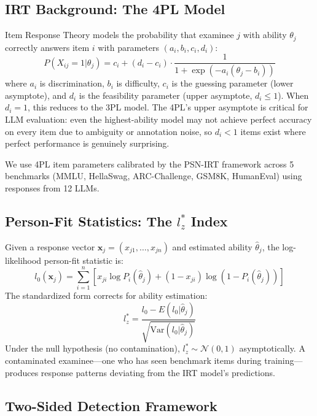 \documentclass[11pt,a4paper]{article}
\begin{document}
\subsection{IRT Background: The 4PL Model}

Item Response Theory models the probability that examinee $j$ with ability $\theta_j$ correctly answers item $i$ with parameters $(a_i, b_i, c_i, d_i)$:
\begin{equation}
P(X_{ij}=1|\theta_j) = c_i + (d_i - c_i) \cdot \frac{1}{1 + \exp(-a_i(\theta_j - b_i))}
\label{eq:4pl}
\end{equation}
where $a_i$ is discrimination, $b_i$ is difficulty, $c_i$ is the guessing parameter (lower asymptote), and $d_i$ is the feasibility parameter (upper asymptote, $d_i \leq 1$). When $d_i = 1$, this reduces to the 3PL model. The 4PL's upper asymptote is critical for LLM evaluation: even the highest-ability model may not achieve perfect accuracy on every item due to ambiguity or annotation noise, so $d_i < 1$ items exist where perfect performance is genuinely surprising.

We use 4PL item parameters calibrated by the PSN-IRT framework \citep{gu2024psn} across 5 benchmarks (MMLU, HellaSwag, ARC-Challenge, GSM8K, HumanEval) using responses from 12 LLMs.

\subsection{Person-Fit Statistics: The $l_z^*$ Index}

Given a response vector $\mathbf{x}_j = (x_{j1}, \ldots, x_{jn})$ and estimated ability $\hat{\theta}_j$, the log-likelihood person-fit statistic is:
\begin{equation}
l_0(\mathbf{x}_j) = \sum_{i=1}^{n} \left[ x_{ji} \log P_i(\hat{\theta}_j) + (1-x_{ji}) \log(1 - P_i(\hat{\theta}_j)) \right]
\end{equation}
The standardized form \citep{snijders2001item} corrects for ability estimation:
\begin{equation}
l_z^* = \frac{l_0 - E(l_0 | \hat{\theta}_j)}{\sqrt{\text{Var}(l_0 | \hat{\theta}_j)}}
\label{eq:lzstar}
\end{equation}
Under the null hypothesis (no contamination), $l_z^* \sim \mathcal{N}(0, 1)$ asymptotically. A contaminated examinee---one who has seen benchmark items during training---produces response patterns deviating from the IRT model's predictions.

\subsection{Two-Sided Detection Framework}
\label{sec:twosided}
\end{document}

